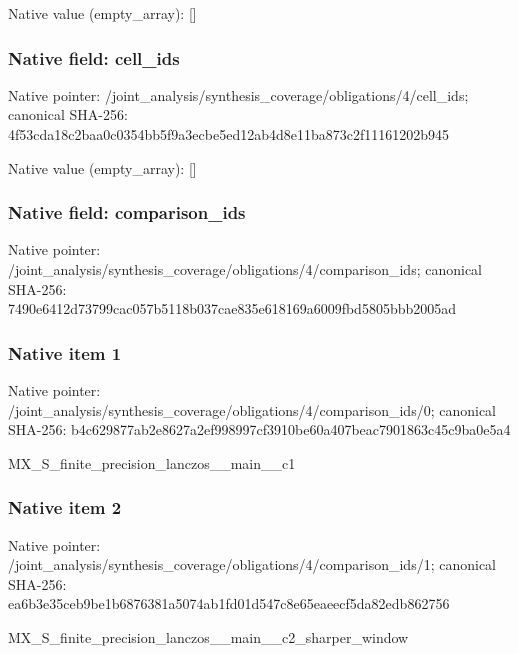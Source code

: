 \documentclass[10pt,a4paper]{article}
\begin{document}
Native value (empty\_\allowbreak{}array): []

\subsubsection{Native field: cell\_\allowbreak{}ids}
Native pointer: /joint\_\allowbreak{}analysis/synthesis\_\allowbreak{}coverage/obligations/4/cell\_\allowbreak{}ids; canonical SHA-256: 4f53cda18c2baa0c0354bb5f9a3ecbe5ed12ab4d8e11ba873c2f11161202b945

Native value (empty\_\allowbreak{}array): []

\subsubsection{Native field: comparison\_\allowbreak{}ids}
Native pointer: /joint\_\allowbreak{}analysis/synthesis\_\allowbreak{}coverage/obligations/4/comparison\_\allowbreak{}ids; canonical SHA-256: 7490e6412d73799cac057b5118b037cae835e618169a6009fbd5805bbb2005ad

\subsubsection{Native item 1}
Native pointer: /joint\_\allowbreak{}analysis/synthesis\_\allowbreak{}coverage/obligations/4/comparison\_\allowbreak{}ids/0; canonical SHA-256: b4c629877ab2e8627a2ef998997cf3910be60a407beac7901863c45c9ba0e5a4

\begingroup\raggedright\sloppy MX\_\allowbreak{}S\_\allowbreak{}finite\_\allowbreak{}precision\_\allowbreak{}lanczos\_\allowbreak{}\_\allowbreak{}main\_\allowbreak{}\_\allowbreak{}c1\par\endgroup

\subsubsection{Native item 2}
Native pointer: /joint\_\allowbreak{}analysis/synthesis\_\allowbreak{}coverage/obligations/4/comparison\_\allowbreak{}ids/1; canonical SHA-256: ea6b3e35ceb9be1b6876381a5074ab1fd01d547c8e65eaeecf5da82edb862756

\begingroup\raggedright\sloppy MX\_\allowbreak{}S\_\allowbreak{}finite\_\allowbreak{}precision\_\allowbreak{}lanczos\_\allowbreak{}\_\allowbreak{}main\_\allowbreak{}\_\allowbreak{}c2\_\allowbreak{}sharper\_\allowbreak{}window\par\endgroup
\end{document}
